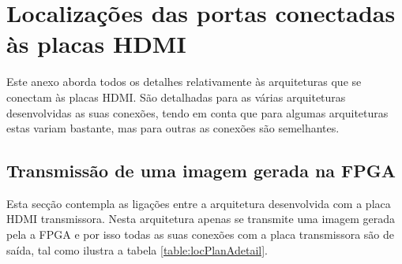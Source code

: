 {\tiny \chapter{Localizações das portas conectadas às placas HDMI} \label{ap3:LOCs}}

Este anexo aborda todos os detalhes relativamente às arquiteturas que se conectam às placas HDMI. São detalhadas para as várias arquiteturas 
desenvolvidas as suas conexões, tendo em conta que para algumas arquiteturas estas variam bastante, mas para outras as conexões são semelhantes.
%
\section{Transmissão de uma imagem gerada na FPGA} \label{ap3:imagemFPGA_TX}
Esta secção contempla as ligações entre a arquitetura desenvolvida com a placa HDMI transmissora. Nesta arquitetura apenas se transmite uma imagem gerada pela a FPGA e por isso todas as suas conexões com a placa transmissora são de saída, tal como ilustra a tabela \ref{table:locPlanAdetail}. 

